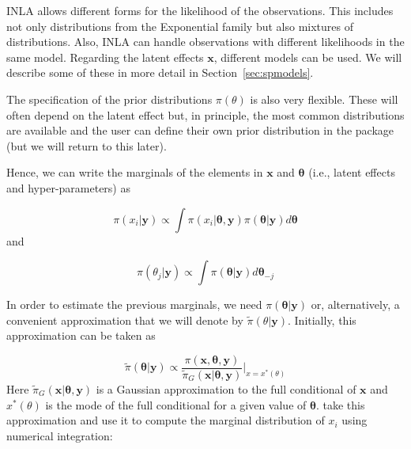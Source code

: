 \documentclass[article]{jss}
\begin{document}
INLA allows different forms for the likelihood of the observations.  This
includes not only distributions from the Exponential family but also mixtures
of distributions. Also, INLA can handle observations with different likelihoods
in the same model. Regarding the latent effects $\mathbf{x}$, different models
can be used. We will describe some of these in more detail in
Section~\ref{sec:spmodels}.


The specification of the prior distributions $\pi(\theta)$ is also very 
flexible. These will often depend on the latent effect but, in principle,
the most common distributions are available and the user can define their
own prior distribution in the  package (but we will return
to this later). 

Hence, we can write the marginals of the elements in $\mathbf{x}$
and $\mathbf{\theta}$ (i.e., latent effects and hyper-parameters) as

\begin{equation}
\pi(x_i|\mathbf{y}) \propto \int \pi(x_i|\mathbf{\theta}, \mathbf{y})  \pi(\mathbf{\theta}| \mathbf{y}) d\mathbf{\theta}
\end{equation}
\noindent
and

\begin{equation}
\pi(\theta_j|\mathbf{y}) \propto \int \pi(\mathbf{\theta}| \mathbf{y})  d\mathbf{\theta}_{-j} 
\end{equation}

In order to estimate the previous marginals, we need 
$\pi(\mathbf{\theta}|\mathbf{y})$ or, alternatively, a convenient
approximation that we will denote by $\tilde\pi(\theta|\mathbf{y})$.
Initially, this approximation can be taken as

\begin{equation}
\tilde\pi(\mathbf{\theta}|\mathbf{y})\propto 
\frac{\pi(\mathbf{x},\mathbf{\theta},\mathbf{y})}{\tilde\pi_G(\mathbf{x}|\mathbf{\theta},\mathbf{y})}\bigg|_{x=x^*(\theta)}
\end{equation}
\noindent
Here 
$\tilde\pi_G(\mathbf{x}|\mathbf{\theta},\mathbf{y})$ is a Gaussian
approximation to the full conditional of $\mathbf{x}$ and $x^*(\theta)$
is the mode of the full conditional for a given value of $\mathbf{\theta}$.
\citet{isi:000264374200002} take this approximation and use it 
to compute the marginal distribution of $x_i$ using numerical integration:
\end{document}
